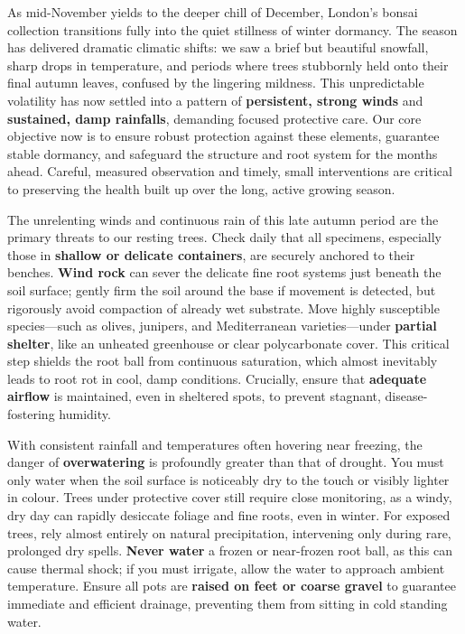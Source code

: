 \label{2025-11-care}
\vfill

\noindent
As mid\--November yields to the deeper chill of December, London's bonsai collection transitions fully into the quiet stillness of winter dormancy. 
The season has delivered dramatic climatic shifts: we saw a brief but beautiful snowfall, sharp drops in temperature, and periods where trees stubbornly held onto their final autumn leaves, confused by the lingering mildness. 
This unpredictable volatility has now settled into a pattern of \textbf{persistent, strong winds} and \textbf{sustained, damp rainfalls}, demanding focused protective care. 
Our core objective now is to ensure robust protection against these elements, guarantee stable dormancy, and safeguard the structure and root system for the months ahead. 
Careful, measured observation and timely, small interventions are critical to preserving the health built up over the long, active growing season.

\medskip
{}
\noindent
The unrelenting winds and continuous rain of this late autumn period are the primary threats to our resting trees. 
Check daily that all specimens, especially those in \textbf{shallow or delicate containers}, are securely anchored to their benches. 
\textbf{Wind rock} can sever the delicate fine root systems just beneath the soil surface; gently firm the soil around the base if movement is detected, but rigorously avoid compaction of already wet substrate. 
Move highly susceptible species---such as olives, junipers, and Mediterranean varieties---under \textbf{partial shelter}, like an unheated greenhouse or clear polycarbonate cover. This critical step shields the root ball from continuous saturation, which almost inevitably leads to root rot in cool, damp conditions. 
Crucially, ensure that \textbf{adequate airflow} is maintained, even in sheltered spots, to prevent stagnant, disease\--fostering humidity.

\medskip
{}
\noindent
With consistent rainfall and temperatures often hovering near freezing, the danger of \textbf{overwatering} is profoundly greater than that of drought. 
You must only water when the soil surface is noticeably dry to the touch or visibly lighter in colour. 
Trees under protective cover still require close monitoring, as a windy, dry day can rapidly desiccate foliage and fine roots, even in winter. 
For exposed trees, rely almost entirely on natural precipitation, intervening only during rare, prolonged dry spells. 
\textbf{Never water} a frozen or near\--frozen root ball, as this can cause thermal shock; if you must irrigate, allow the water to approach ambient temperature. 
Ensure all pots are \textbf{raised on feet or coarse gravel} to guarantee immediate and efficient drainage, preventing them from sitting in cold standing water.

